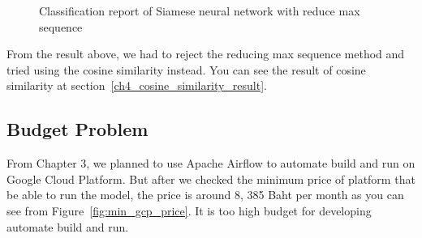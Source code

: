 \documentclass[12pt,oneside,openright,a4paper]{cpe-english-project}
\begin{document}
\begin{figure}[!h]\centering
{}
\caption{Classification report of Siamese neural network with reduce max sequence}
\label{fig:reduce_sequence_result}
\end{figure}

From the result above, we had to reject the reducing max sequence method and
tried using the cosine similarity instead. You can see the result of cosine similarity
at section~\ref*{ch4_cosine_similarity_result}.

\subsection{Budget Problem}
From Chapter 3, we planned to use Apache Airflow to automate build and run on Google Cloud Platform.
But after we checked the minimum price of platform that be able to run the model,
the price is around 8,	385 Baht per month as you can see from Figure~\ref*{fig:min_gcp_price}.
It is too high budget for developing automate build and run.
\end{document}
